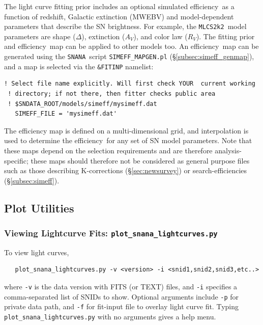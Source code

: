 \documentclass[12pt]{article}
\newcommand{\mlcs}{{\tt MLCS2k2}}
\newcommand{\snana}{{\tt SNANA}}
\newcommand{\eff}{efficiency}
\begin{document}
The light curve fitting prior includes an optional 
simulated \eff\ as a function of redshift, 
Galactic extinction (MWEBV) and model-dependent parameters 
that describe the SN brightness.
For example, the \mlcs\ model parameters are shape
($\Delta$), extinction ($A_V$), and color law ($R_V$).
The fitting prior and \eff\ map can be applied to 
other models too.
An \eff\ map can be generated using the \snana\ script
{\tt SIMEFF\_MAPGEN.pl} (\S\ref{subsec:simeff_genmap}),
and a map is selected via the {\tt \&FITINP} namelist: 
%
\begin{Verbatim}[frame=single]
 ! Select file name explicitly. Will first check YOUR  current working 
 ! directory; if not there, then fitter checks public area 
 ! $SNDATA_ROOT/models/simeff/mysimeff.dat
   SIMEFF_FILE = 'mysimeff.dat'
\end{Verbatim}
The efficiency map is defined on a multi-dimensional grid,
and interpolation is used to determine the \eff\ for any 
set of SN  model parameters.  
Note that these maps depend on the selection
requirements and are therefore analysis-specific;
these maps should therefore not be considered as
general purpose files such as those describing
K-corrections (\S\ref{sec:newsurvey}) or
search-efficiencies (\S\ref{subsec:simeff}).


 \clearpage
 \subsection{Plot Utilities}
   \label{subsec:plot_util}

  \subsubsection{Viewing Lightcurve Fits: {\tt plot\_snana\_lightcurves.py} }
   \label{sss:lcplot}

To view light curves,
\begin{verbatim}
   plot_snana_lightcurves.py -v <version> -i <snid1,snid2,snid3,etc..>
\end{verbatim}
where {\tt -v} is the data version with FITS (or TEXT) files,
and {\tt -i} specifies a comma-separated list of SNIDs to show.
Optional arguments include {\tt -p} for private data path,
and {\tt -f} for fit-input file to overlay light curve fit. 
Typing {\tt plot\_snana\_lightcurves.py} with no arguments gives a help menu.

\end{document}

